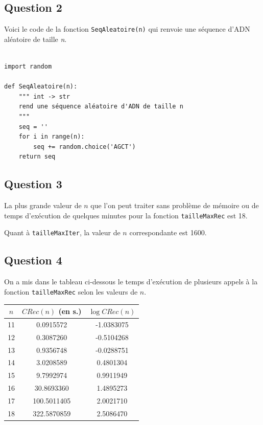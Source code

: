 \documentclass[12pt,a4paper]{article}
\begin{document}
\newpage
\subsection{Question 2}
Voici le code de la fonction \texttt{SeqAleatoire(n)} qui renvoie une s\'equence d'ADN al\'eatoire de taille {\itshape n}.
\begin{lstlisting}

import random

def SeqAleatoire(n):
    """ int -> str
    rend une séquence aléatoire d'ADN de taille n 
    """
    seq = ''
    for i in range(n):
        seq += random.choice('AGCT')
    return seq
\end{lstlisting}

\subsection{Question 3}
La plus grande valeur de $n$ que l'on peut traiter sans probl\`eme de m\'emoire ou de temps d'ex\'ecution de quelques minutes pour la fonction \texttt{tailleMaxRec} est 18. 

Quant \`a \texttt{tailleMaxIter}, la valeur de $n$ correspondante est 1600.

\subsection{Question 4}
On a mis dans le tableau ci-dessous le temps d'ex\'ecution de plusieurs appels \`a la fonction \texttt{tailleMaxRec} selon les valeurs de $n$.
	\begin{center}
	\begin{tabular}{|c|cc|}
	\hline $n$ & $CRec(n)$ (en s.) & $\log CRec(n)$ \\
	\hline 11 &   0.0915572 & -1.0383075 \\ 
	\hline 12 &   0.3087260 & -0.5104268 \\ 
	\hline 13 &   0.9356748 & -0.0288751 \\ 
	\hline 14 &   3.0208589 &  0.4801304 \\
	\hline 15 &   9.7992974 &  0.9911949 \\ 
	\hline 16 &  30.8693360 &  1.4895273 \\ 
	\hline 17 & 100.5011405 &  2.0021710 \\
	\hline 18 & 322.5870859 &  2.5086470 \\
	\hline
	\end{tabular}
	\end{center}
	
\end{document}
